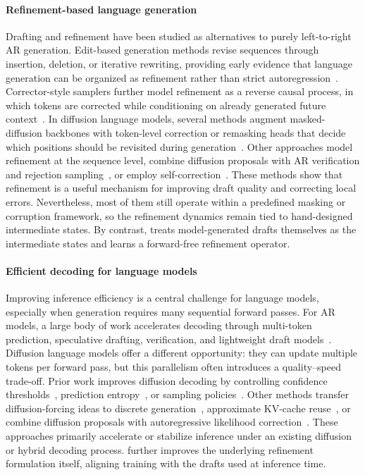 \paragraph{Refinement-based language generation}
Drafting and refinement have been studied as alternatives to purely left-to-right AR generation.
Edit-based generation methods revise sequences through insertion, deletion, or iterative rewriting, providing early evidence that language generation can be organized as refinement rather than strict autoregression~\citep{levenshtein,diffuser}.
Corrector-style samplers further model refinement as a reverse causal process, in which tokens are corrected while conditioning on already generated future context~\citep{correctorar}.
In diffusion language models, several methods augment masked-diffusion backbones with token-level correction or remasking heads that decide which positions should be revisited during generation~\citep{informedcorrector,remedi,prism, GIDD}.
Other approaches model refinement at the sequence level, combine diffusion proposals with AR verification and rejection sampling~\citep{selfspec,tidar}, or employ self-correction~\citep{rediff,corrective-dlm,llada21}.
These methods show that refinement is a useful mechanism for improving draft quality and correcting local errors.
Nevertheless, most of them still operate within a predefined masking or corruption framework, so the refinement dynamics remain tied to hand-designed intermediate states.
By contrast, \method treats model-generated drafts themselves as the intermediate states and learns a forward-free refinement operator.
\vspace{-4pt}

\paragraph{Efficient decoding for language models}
Improving inference efficiency is a central challenge for language models, especially when generation requires many sequential forward passes.
For AR models, a large body of work accelerates decoding through multi-token prediction, speculative drafting, verification, and lightweight draft models~\citep{mtp-parallel,deepseek-v3,eagle1,eagle2,eagle3}.
Diffusion language models offer a different opportunity: they can update multiple tokens per forward pass, but this parallelism often introduces a quality--speed trade-off.
Prior work improves diffusion decoding by controlling confidence thresholds~\citep{diff-speed-conf, fast-dllm}, prediction entropy~\citep{eb-sampler}, or sampling policies~\citep{seed-diffusion, trace, credit-decoding}.
Other methods transfer diffusion-forcing ideas to discrete generation~\citep{diffusion-forcing,D2F}, approximate KV-cache reuse~\citep{fast-dllm,fast-dllm2, dKV_Cache}, or combine diffusion proposals with autoregressive likelihood correction~\citep{selfspec,tidar, dflash}.
These approaches primarily accelerate or stabilize inference under an existing diffusion or hybrid decoding process.
\method further improves the underlying refinement formulation itself, aligning training with the drafts used at inference time.
